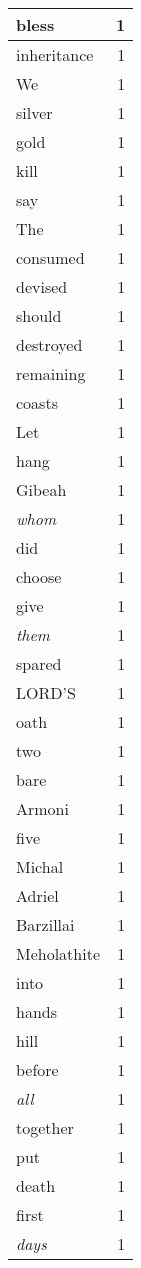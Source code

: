 \begin{center}
\begin{longtable}{l|r}
bless & 1 \\ \hline
inheritance & 1 \\ \hline
We & 1 \\ \hline
silver & 1 \\ \hline
gold & 1 \\ \hline
kill & 1 \\ \hline
say & 1 \\ \hline
The & 1 \\ \hline
consumed & 1 \\ \hline
devised & 1 \\ \hline
should & 1 \\ \hline
destroyed & 1 \\ \hline
remaining & 1 \\ \hline
coasts & 1 \\ \hline
Let & 1 \\ \hline
hang & 1 \\ \hline
Gibeah & 1 \\ \hline
\emph{whom} & 1 \\ \hline
did & 1 \\ \hline
choose & 1 \\ \hline
give & 1 \\ \hline
\emph{them} & 1 \\ \hline
spared & 1 \\ \hline
LORD'S & 1 \\ \hline
oath & 1 \\ \hline
two & 1 \\ \hline
bare & 1 \\ \hline
Armoni & 1 \\ \hline
five & 1 \\ \hline
Michal & 1 \\ \hline
Adriel & 1 \\ \hline
Barzillai & 1 \\ \hline
Meholathite & 1 \\ \hline
into & 1 \\ \hline
hands & 1 \\ \hline
hill & 1 \\ \hline
before & 1 \\ \hline
\emph{all} & 1 \\ \hline
together & 1 \\ \hline
put & 1 \\ \hline
death & 1 \\ \hline
first & 1 \\ \hline
\emph{days} & 1 \\ \hline

\end{longtable}
\end{center}
